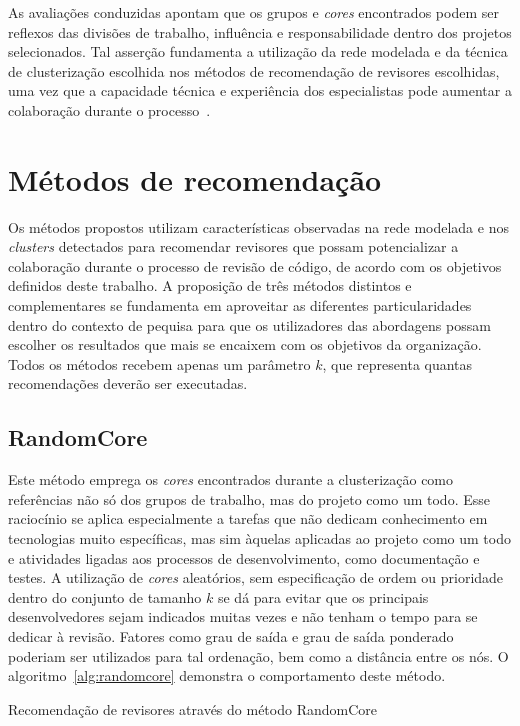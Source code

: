 \documentclass[12pt,openany,oneside,a4paper,english,brazil]{abntbibufjf}
\begin{document}
As avaliações conduzidas apontam que os grupos e \textit{cores} encontrados podem ser reflexos das divisões de trabalho, influência e responsabilidade dentro dos projetos selecionados. Tal asserção fundamenta a utilização da rede modelada e da técnica de clusterização escolhida nos métodos de recomendação de revisores escolhidas, uma vez que a capacidade técnica e experiência dos especialistas pode aumentar a colaboração durante o processo~\cite{Bosu2014, kovalenko2018}.


\section{Métodos de recomendação}
  Os métodos propostos utilizam características observadas na rede modelada e nos \textit{clusters} detectados para recomendar revisores que possam potencializar a colaboração durante o processo de revisão de código, de acordo com os objetivos definidos deste trabalho. A proposição de três métodos distintos e complementares se fundamenta em aproveitar as diferentes particularidades dentro do contexto de pequisa para que os utilizadores das abordagens possam escolher os resultados que mais se encaixem com os objetivos da organização. Todos os métodos recebem apenas um parâmetro $k$, que representa quantas recomendações deverão ser executadas.

  \subsection{RandomCore}
    Este método emprega os \textit{cores} encontrados durante a clusterização como referências não só dos grupos de trabalho, mas do projeto como um todo. Esse raciocínio se aplica especialmente a tarefas que não dedicam conhecimento em tecnologias muito específicas, mas sim àquelas aplicadas ao projeto como um todo e atividades ligadas aos processos de desenvolvimento, como documentação e testes. A utilização de \textit{cores} aleatórios, sem especificação de ordem ou prioridade dentro do conjunto de tamanho $k$ se dá para evitar que os principais desenvolvedores sejam indicados muitas vezes e não tenham o tempo para se dedicar à revisão. Fatores como grau de saída e grau de saída ponderado poderiam ser utilizados para tal ordenação, bem como a distância entre os nós. O algoritmo~\ref{alg:randomcore} demonstra o comportamento deste método.


\begin{algorithm}

 \caption{Recomendação de revisores através do método RandomCore}\label{alg:randomcore}

\end{algorithm}
\end{document}
